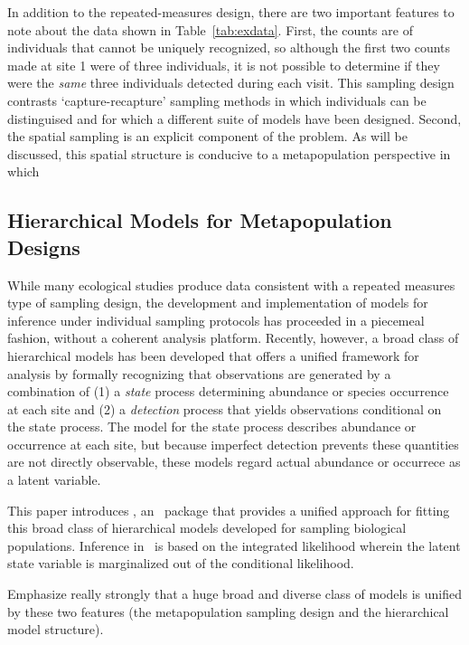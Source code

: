 \documentclass[article,shortnames]{jss}
\newcommand{\um}{\pkg{unmarked}}
\newcommand{\rlang}{\proglang{R}}
\begin{document}
In addition to the repeated-measures design, there are two important 
features to note about the data shown in Table~\ref{tab:exdata}.  First, 
the counts are of individuals that cannot be uniquely recognized, so 
although the first two counts made at site 1 were of three individuals, 
it is not possible to determine if they were the 
{\it same} three individuals detected during each visit. This sampling 
design contrasts `capture-recapture' sampling methods in which individuals 
can be distinguised and for which a different suite of models 
have been designed. Second, the spatial sampling is an explicit component of
the problem. As will be discussed, this spatial structure is conducive to a
metapopulation perspective in which 

\subsection{Hierarchical Models for Metapopulation Designs}

While many ecological studies produce data consistent with a repeated 
measures type of sampling design, the development and implementation of 
models for inference under individual sampling protocols has 
proceeded in a piecemeal fashion, without a coherent analysis 
platform. Recently, however, a broad class of hierarchical models has 
been developed that offers a unified framework for analysis by formally 
recognizing that observations are 
generated by a combination of (1) a \emph{state} process 
determining abundance or species occurrence at each site and (2) a 
\emph{detection} process that yields observations conditional on the 
state process. The model for the state process describes abundance or 
occurrence at each site, but because imperfect detection prevents these quantities are not directly 
observable, these models regard actual abundance or occurrece as a 
latent variable. 

This paper introduces \um, an \rlang\ package that provides a 
unified approach for fitting this broad class of hierarchical 
models developed for sampling biological populations.  Inference in \um\ 
is based on the integrated likelihood wherein the latent state 
variable is marginalized out of the conditional likelihood.

Emphasize really strongly that a huge broad and diverse class of models is 
unified by these two features (the metapopulation sampling design and the 
hierarchical model structure).
\end{document}
